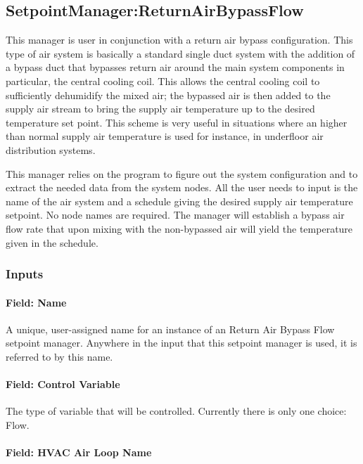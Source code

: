 \subsection{SetpointManager:ReturnAirBypassFlow}\label{setpointmanagerreturnairbypassflow}

This manager is user in conjunction with a return air bypass configuration. This type of air system is basically a standard single duct system with the addition of a bypass duct that bypasses return air around the main system components in particular, the central cooling coil. This allows the central cooling coil to sufficiently dehumidify the mixed air; the bypassed air is then added to the supply air stream to bring the supply air temperature up to the desired temperature set point. This scheme is very useful in situations where an higher than normal supply air temperature is used for instance, in underfloor air distribution systems.

This manager relies on the program to figure out the system configuration and to extract the needed data from the system nodes. All the user needs to input is the name of the air system and a schedule giving the desired supply air temperature setpoint. No node names are required. The manager will establish a bypass air flow rate that upon mixing with the non-bypassed air will yield the temperature given in the schedule.

\subsubsection{Inputs}\label{inputs-12-016}

\paragraph{Field: Name}\label{field-name-12-010}

A unique, user-assigned name for an instance of an Return Air Bypass Flow setpoint manager. Anywhere in the input that this setpoint manager is used, it is referred to by this name.

\paragraph{Field: Control Variable}\label{field-control-variable-12}

The type of variable that will be controlled. Currently there is only one choice: Flow.

\paragraph{Field: HVAC Air Loop Name}\label{field-hvac-air-loop-name-2}

